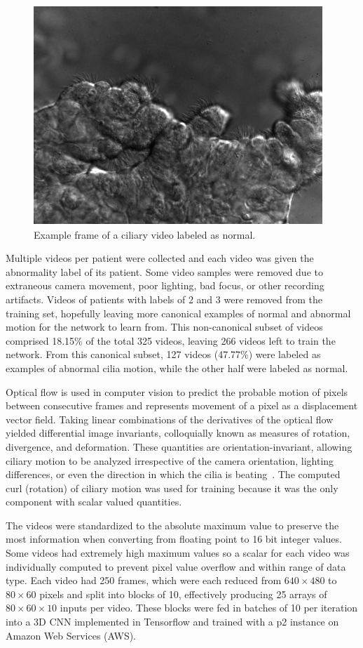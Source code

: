 \begin{figure}[htp]
\includegraphics[scale=0.5]{grey_1011-5_heathly}
\caption{Example frame of a ciliary video labeled as normal.}
\end{figure}

Multiple videos per patient were collected and each video was given the abnormality label of its patient. Some video samples were removed due to extraneous camera movement, poor lighting, bad focus, or other recording artifacts. Videos of patients with labels of 2 and 3 were removed from the training set, hopefully leaving more canonical examples of normal and abnormal motion for the network to learn from. This non-canonical subset of videos comprised 18.15\% of  the total 325 videos, leaving 266 videos left to train the network. From this canonical subset, 127 videos (47.77\%) were labeled as examples of abnormal cilia motion, while the other half were labeled as normal.
 
Optical flow is used in computer vision to predict the probable motion of pixels between consecutive frames and represents movement of a pixel as a displacement vector field. Taking linear combinations of the derivatives of the optical flow yielded differential image invariants, colloquially known as measures of rotation, divergence, and deformation. These quantities are orientation-invariant, allowing ciliary motion to be analyzed irrespective of the camera orientation, lighting differences, or even the direction in which the cilia is beating~\cite{quinn2015automated}. The computed curl (rotation) of ciliary motion was used for training because it was the only component with scalar valued quantities. 
 
The videos were standardized to the absolute maximum value to preserve the most information when converting from floating point to 16 bit integer values. Some videos had extremely high maximum values so a scalar for each video was individually computed to prevent pixel value overflow and within range of data type. Each video had 250 frames, which were each reduced from $640 \times 480$ to $80 \times 60$ pixels and split into blocks of 10, effectively producing 25 arrays of $80 \times 60 \times 10$ inputs per video. These blocks were fed in batches of 10 per iteration into a 3D CNN implemented in Tensorflow and trained with a p2 instance on Amazon Web Services (AWS). 

